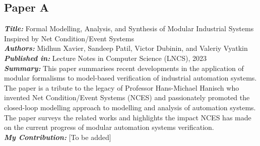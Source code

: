 \subsection{Paper A}
\textbf{\textit{Title:}} Formal Modelling, Analysis, and Synthesis of Modular Industrial Systems Inspired by Net Condition/Event Systems\\
\textbf{\textit{Authors:}} Midhun Xavier, Sandeep Patil, Victor Dubinin, and Valeriy Vyatkin\\
\textbf{\textit{Published in:}} Lecture Notes in Computer Science (LNCS), 2023\\
\textbf{\textit{Summary:}} This paper summarises recent developments in the application of modular formalisms to model-based verification of industrial automation systems. The paper is a tribute to the legacy of Professor Hans-Michael Hanisch who invented Net Condition/Event Systems (NCES) and passionately promoted the closed-loop modelling approach to modelling and analysis of automation systems. The paper surveys the related works and highlights the impact NCES has made on the current progress of modular automation systems verification.\\
\textbf{\textit{My Contribution:}} [To be added]

